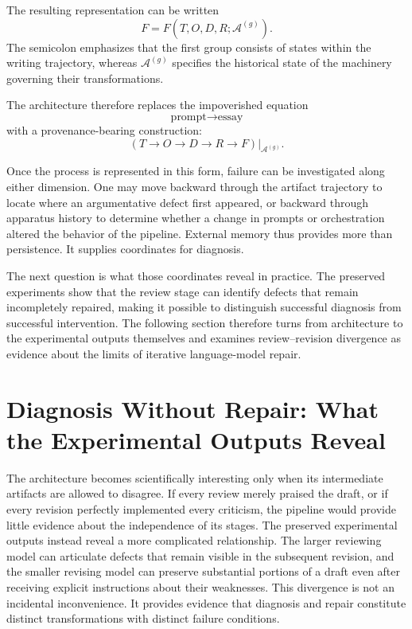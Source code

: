 \documentclass[11pt]{article}
\begin{document}
The resulting representation can be written
\[
    F
    =
    F
    \left(
        T,
        O,
        D,
        R;
        \mathcal{A}^{(g)}
    \right).
\]
The semicolon emphasizes that the first group consists of states within the writing trajectory, whereas \(\mathcal{A}^{(g)}\) specifies the historical state of the machinery governing their transformations.

The architecture therefore replaces the impoverished equation
\[
    \text{prompt}\rightarrow\text{essay}
\]
with a provenance-bearing construction:
\[
    \left(
        T
        \rightarrow
        O
        \rightarrow
        D
        \rightarrow
        R
        \rightarrow
        F
    \right)
    \Bigg|_{\mathcal{A}^{(g)}}.
\]

Once the process is represented in this form, failure can be investigated along either dimension. One may move backward through the artifact trajectory to locate where an argumentative defect first appeared, or backward through apparatus history to determine whether a change in prompts or orchestration altered the behavior of the pipeline. External memory thus provides more than persistence. It supplies coordinates for diagnosis.

The next question is what those coordinates reveal in practice. The preserved experiments show that the review stage can identify defects that remain incompletely repaired, making it possible to distinguish successful diagnosis from successful intervention. The following section therefore turns from architecture to the experimental outputs themselves and examines review--revision divergence as evidence about the limits of iterative language-model repair.

\section{Diagnosis Without Repair: What the Experimental Outputs Reveal}

The architecture becomes scientifically interesting only when its intermediate artifacts are allowed to disagree. If every review merely praised the draft, or if every revision perfectly implemented every criticism, the pipeline would provide little evidence about the independence of its stages. The preserved experimental outputs instead reveal a more complicated relationship. The larger reviewing model can articulate defects that remain visible in the subsequent revision, and the smaller revising model can preserve substantial portions of a draft even after receiving explicit instructions about their weaknesses. This divergence is not an incidental inconvenience. It provides evidence that diagnosis and repair constitute distinct transformations with distinct failure conditions.
\end{document}
